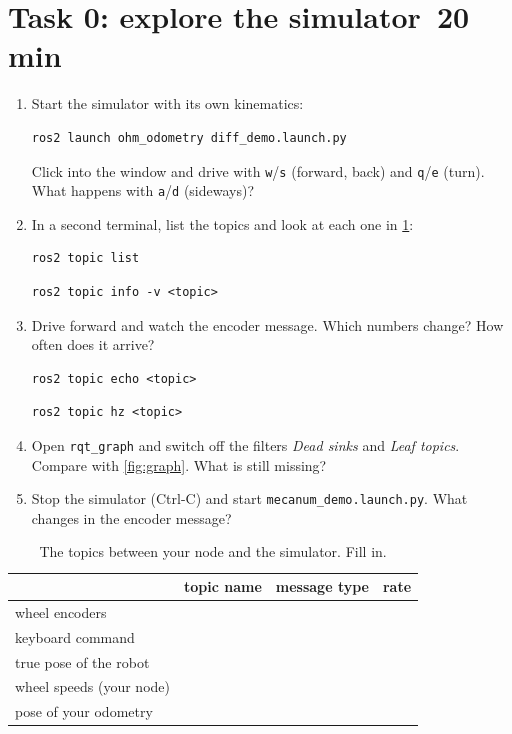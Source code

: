 \documentclass[11pt,a4paper,parskip=half]{scrartcl}
\newcommand{\thema}[1]{\texttt{#1}}
\newcommand{\minutes}[1]{\hfill{\normalsize\mdseries\color{ohmgrey}\faClock[regular]~#1 min}}
\begin{document}
\section{Task 0: explore the simulator\minutes{20}}
\label{sec:task0}
\begin{enumerate}
  \item Start the simulator with its own kinematics:
\begin{lstlisting}
ros2 launch ohm_odometry diff_demo.launch.py
\end{lstlisting}
        Click into the window and drive with \thema{w}/\thema{s} (forward, back) and
        \thema{q}/\thema{e} (turn). What happens with \thema{a}/\thema{d} (sideways)?
  \item In a second terminal, list the topics and look at each one in \cref{tab:interface}:
\begin{lstlisting}
ros2 topic list
\end{lstlisting}
\begin{lstlisting}
ros2 topic info -v <topic>
\end{lstlisting}
  \item Drive forward and watch the encoder message. Which numbers change? How often does it arrive?
\begin{lstlisting}
ros2 topic echo <topic>
\end{lstlisting}
\begin{lstlisting}
ros2 topic hz <topic>
\end{lstlisting}
  \item Open \thema{rqt\_graph} and switch off the filters \emph{Dead sinks} and \emph{Leaf topics}.
        Compare with \cref{fig:graph}. What is still missing?
  \item Stop the simulator (Ctrl-C) and start \thema{mecanum\_demo.launch.py}. What changes in the
        encoder message?
\end{enumerate}

\begin{table}[ht]\centering
\renewcommand{\arraystretch}{2.0}
\caption{The topics between your node and the simulator. Fill in.}
\label{tab:interface}
\begin{tabular}{@{}>{\raggedright\arraybackslash}p{4.2cm}p{3.9cm}p{4.4cm}p{1.3cm}@{}}
\toprule
& topic name & message type & rate \\
\midrule
wheel encoders & & & \\
keyboard command & & & \\
true pose of the robot & & & \\
wheel speeds (your node) & & & \\
pose of your odometry & & & \\
\bottomrule
\end{tabular}
\end{table}
\end{document}
